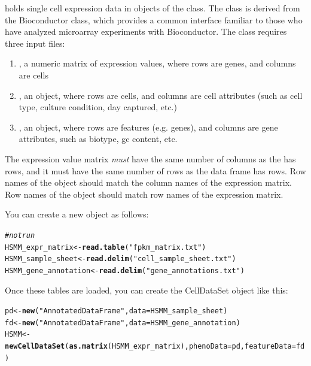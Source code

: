 \documentclass[10pt,oneside]{article}\usepackage[]{graphicx}\usepackage[]{color}
\makeatletter
\newcommand{\hlstr}[1]{\textcolor[rgb]{0.192,0.494,0.8}{#1}}%
\newcommand{\hlcom}[1]{\textcolor[rgb]{0.678,0.584,0.686}{\textit{#1}}}%
\newcommand{\hlstd}[1]{\textcolor[rgb]{0.345,0.345,0.345}{#1}}%
\newcommand{\hlkwb}[1]{\textcolor[rgb]{0.69,0.353,0.396}{#1}}%
\newcommand{\hlkwc}[1]{\textcolor[rgb]{0.333,0.667,0.333}{#1}}%
\newcommand{\hlkwd}[1]{\textcolor[rgb]{0.737,0.353,0.396}{\textbf{#1}}}%
\newenvironment{kframe}{%
 \def\at@end@of@kframe{}%
 \ifinner\ifhmode%
  \def\at@end@of@kframe{\end{minipage}}%
  \begin{minipage}{\columnwidth}%
 \fi\fi%
 \def\FrameCommand##1{\hskip\@totalleftmargin \hskip-\fboxsep
 \colorbox{shadecolor}{##1}\hskip-\fboxsep
     \hskip-\linewidth \hskip-\@totalleftmargin \hskip\columnwidth}%
 \MakeFramed {\advance\hsize-\width
   \@totalleftmargin\z@ \linewidth\hsize
   \@setminipage}}%
 {\par\unskip\endMakeFramed%
 \at@end@of@kframe}
\newenvironment{knitrout}{}{} %
\makeatother
\begin{document}
 holds single cell expression data in objects of the  class. The class is derived from the Bioconductor  class, which provides a common interface familiar to those who have analyzed microarray experiments with Bioconductor. The class requires three input files:
\begin{enumerate}
  \item {}, a numeric matrix of expression values, where rows are genes, and columns are cells
  \item {}, an  object, where rows are cells, and columns are cell attributes (such as cell type, culture condition, day captured, etc.)
  \item {}, an  object, where rows are features (e.g. genes), and columns are gene attributes, such as biotype, gc content, etc.
\end{enumerate}

The expression value matrix \emph{must} have the same number of columns as the  has rows, and it must have the same number of rows as the  data frame has rows. Row names of the  object should match the column names of the expression matrix. Row names of the  object should match row names of the expression matrix.

You can create a new  object as follows:  

\begin{knitrout}
\color{fgcolor}\begin{kframe}
\begin{alltt}
\hlcom{#not run}
\hlstd{HSMM_expr_matrix} \hlkwb{<-} \hlkwd{read.table}\hlstd{(}\hlstr{"fpkm_matrix.txt"}\hlstd{)}
\hlstd{HSMM_sample_sheet} \hlkwb{<-} \hlkwd{read.delim}\hlstd{(}\hlstr{"cell_sample_sheet.txt"}\hlstd{)}
\hlstd{HSMM_gene_annotation} \hlkwb{<-} \hlkwd{read.delim}\hlstd{(}\hlstr{"gene_annotations.txt"}\hlstd{)}
\end{alltt}
\end{kframe}
\end{knitrout}

Once these tables are loaded, you can create the CellDataSet object like this:

\begin{knitrout}
\color{fgcolor}\begin{kframe}
\begin{alltt}
\hlstd{pd} \hlkwb{<-} \hlkwd{new}\hlstd{(}\hlstr{"AnnotatedDataFrame"}\hlstd{,} \hlkwc{data} \hlstd{= HSMM_sample_sheet)}
\hlstd{fd} \hlkwb{<-} \hlkwd{new}\hlstd{(}\hlstr{"AnnotatedDataFrame"}\hlstd{,} \hlkwc{data} \hlstd{= HSMM_gene_annotation)}
\hlstd{HSMM} \hlkwb{<-} \hlkwd{newCellDataSet}\hlstd{(}\hlkwd{as.matrix}\hlstd{(HSMM_expr_matrix),} \hlkwc{phenoData} \hlstd{= pd,} \hlkwc{featureData} \hlstd{= fd)}
\end{alltt}
\end{kframe}
\end{knitrout}
\end{document}

